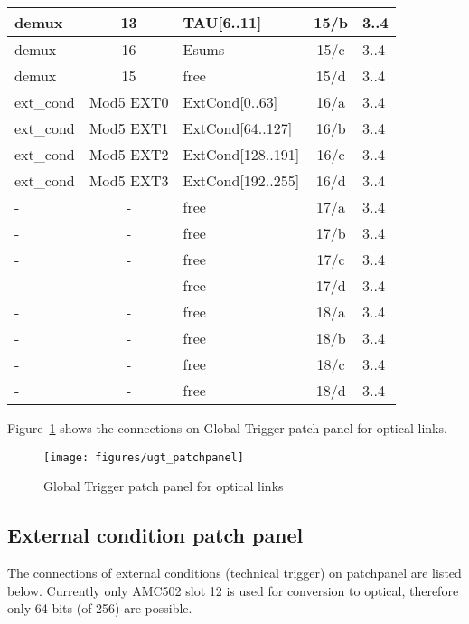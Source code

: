 \begin{longtable}{|l|c|l|c|l|}
demux & 13  & TAU[6..11] & 15/b & 3..4 \\\hline
demux & 16  & Esums      & 15/c & 3..4 \\\hline
demux & 15  & free       & 15/d & 3..4 \\\hline
ext\_cond & Mod5 EXT0 & ExtCond[0..63]    & 16/a & 3..4 \\\hline
ext\_cond & Mod5 EXT1 & ExtCond[64..127]  & 16/b & 3..4 \\\hline
ext\_cond & Mod5 EXT2 & ExtCond[128..191] & 16/c & 3..4 \\\hline
ext\_cond & Mod5 EXT3 & ExtCond[192..255] & 16/d & 3..4 \\\hline
- & - & free & 17/a & 3..4 \\\hline
- & - & free & 17/b & 3..4 \\\hline
- & - & free & 17/c & 3..4 \\\hline
- & - & free & 17/d & 3..4 \\\hline
- & - & free & 18/a & 3..4 \\\hline
- & - & free & 18/b & 3..4 \\\hline
- & - & free & 18/c & 3..4 \\\hline
- & - & free & 18/d & 3..4 \\\hline
\end{longtable}

Figure~\ref{fig:app:ugt_pp} shows the connections on Global Trigger patch panel for optical links.

\begin{figure}[htb]
\centering
\texttt{[image: figures/ugt\_patchpanel]}
\caption{Global Trigger patch panel for optical links}
\label{fig:app:ugt_pp}
\end{figure}

\subsection{External condition patch panel}\label{sec:app:ext_cond_pp}

The connections of external conditions (technical trigger) on patchpanel are listed below. Currently only AMC502 slot 12 is used for conversion to optical, therefore only 64 bits (of 256) are possible.

